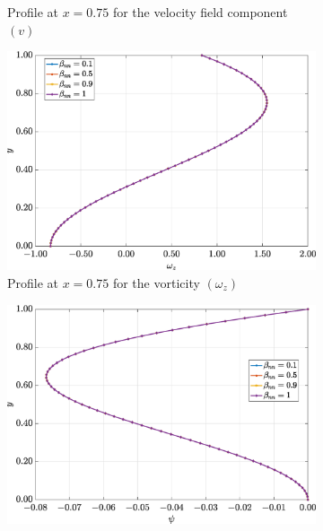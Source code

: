 \documentclass[preprint, 12pt]{elsarticle}
\begin{document}
\begin{figure}[H]
\begin{subfigure}[b]{.46\textwidth}
        \caption{Profile at $x=0.75$ for the velocity field component $(v)$}
        \label{fig_slice_y_v_2nd_Case1_giesekus_x075}
    \end{subfigure}
    \begin{subfigure}[b]{.46\textwidth}
        \includegraphics[width=\textwidth]{Slice_x_Tog_Numerical_NormErr_2nd_Betann_1_Re_1000_Wi_1_epsilon_0_xi_0_alphaG_0.5_Dt_1e-06_at_0.05_tipsim_1_MMS_12_x0.75y0.75_Wz.eps}
        \caption{Profile at $x=0.75$ for the vorticity $(\omega_{z})$}
        \label{fig_slice_y_wz_2nd_Case1_giesekus_x075}
    \end{subfigure}
    \vspace{0.2cm}
    \qquad
    \begin{subfigure}[b]{.46\textwidth}
        \includegraphics[width=\textwidth]{Slice_x_Tog_Numerical_NormErr_2nd_Betann_1_Re_1000_Wi_1_epsilon_0_xi_0_alphaG_0.5_Dt_1e-06_at_0.05_tipsim_1_MMS_12_x0.75y0.75_Psi.eps}

\end{subfigure}
\end{figure}
\end{document}
